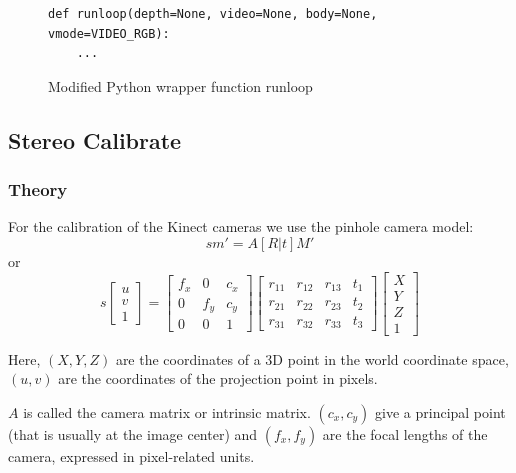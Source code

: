 \begin{figure}[H]
\begin{lstlisting}
def runloop(depth=None, video=None, body=None, vmode=VIDEO_RGB):
    ...
\end{lstlisting}
\caption{Modified Python wrapper function runloop}
\label{code:mod_runloop}
\end{figure}


\subsection{Stereo Calibrate}
\label{sec:stereo_calibrate}

\subsubsection{Theory}
For the calibration of the Kinect cameras we use the pinhole camera model:
\[
s m' = A \left[R|t\right]M'
\]
or
\[
s 
\left[ \begin{array}{c} 
u\\
v\\
1  
\end{array} \right]
=
\left[ \begin{array}{ccc} 
f_x & 0 & c_x\\
0 & f_y & c_y\\
0 & 0 & 1  
\end{array} \right]
\left[ \begin{array}{cccc}
r_{11} & r_{12} & r_{13} & t_1\\
r_{21} & r_{22} & r_{23} & t_2\\
r_{31} & r_{32} & r_{33} & t_3
\end{array} \right]
\left[ \begin{array}{c} 
X\\
Y\\
Z\\
1  
\end{array} \right]
\]

Here, $\left( X, Y, Z \right)$ are the coordinates of a 3D point in the world coordinate space, $\left( u, v \right)$ are the coordinates of the projection point in pixels.

$A$ is called the camera matrix or intrinsic matrix. $\left( c_x, c_y \right)$ give a principal point (that is usually at the image center) and $\left( f_x, f_y \right)$ are the focal lengths of the camera, expressed in pixel-related units.

